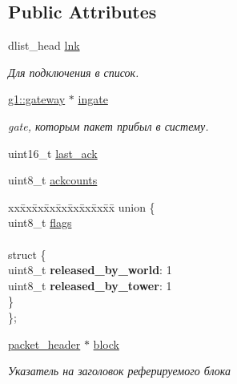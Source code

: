 \subsection*{Public Attributes}
\begin{DoxyCompactItemize}
\item 
dlist\+\_\+head \hyperlink{structg1_1_1packet_ad385dbb95d429aa9616059bd374b359b}{lnk}\hypertarget{structg1_1_1packet_ad385dbb95d429aa9616059bd374b359b}{}\label{structg1_1_1packet_ad385dbb95d429aa9616059bd374b359b}

\begin{DoxyCompactList}\small\item\em Для подключения в список. \end{DoxyCompactList}\item 
\hyperlink{structg1_1_1gateway}{g1\+::gateway} $\ast$ \hyperlink{structg1_1_1packet_ae5b9f8200d6c128cd9a4a436c1f8d1dc}{ingate}\hypertarget{structg1_1_1packet_ae5b9f8200d6c128cd9a4a436c1f8d1dc}{}\label{structg1_1_1packet_ae5b9f8200d6c128cd9a4a436c1f8d1dc}

\begin{DoxyCompactList}\small\item\em gate, которым пакет прибыл в систему. \end{DoxyCompactList}\item 
uint16\+\_\+t \hyperlink{structg1_1_1packet_a3a260b0ab8300cd034be8a023ff8189d}{last\+\_\+ack}
\item 
uint8\+\_\+t \hyperlink{structg1_1_1packet_a885a0ecdce163a529a58cc9b53ff323b}{ackcounts}
\item 
\begin{tabbing}
xx\=xx\=xx\=xx\=xx\=xx\=xx\=xx\=xx\=\kill
union \{\\
\>uint8\_t \hyperlink{structg1_1_1packet_aeb31a298732861167f07f7ae38e25c07}{flags}\\
\>\\
\>struct \{\\
\>\>uint8\_t {\bfseries released\_by\_world}: 1\\
\>\>uint8\_t {\bfseries released\_by\_tower}: 1\\
\>\} \hypertarget{uniong1_1_1packet_1_1_0D4_a13673b76b09c9f880f62f539488b7117}{}\label{uniong1_1_1packet_1_1_0D4_a13673b76b09c9f880f62f539488b7117}
\\
\}; \hypertarget{structg1_1_1packet_af94d16abf234fdcfb447b00ed332ba9d}{}\label{structg1_1_1packet_af94d16abf234fdcfb447b00ed332ba9d}
\\

\end{tabbing}\item 
\hyperlink{structg1_1_1packet__header}{packet\+\_\+header} $\ast$ \hyperlink{structg1_1_1packet_a0647831e03bcc456f9d4349ac4db440e}{block}\hypertarget{structg1_1_1packet_a0647831e03bcc456f9d4349ac4db440e}{}\label{structg1_1_1packet_a0647831e03bcc456f9d4349ac4db440e}

\begin{DoxyCompactList}\small\item\em Указатель на заголовок реферируемого блока \end{DoxyCompactList}\end{DoxyCompactItemize}


